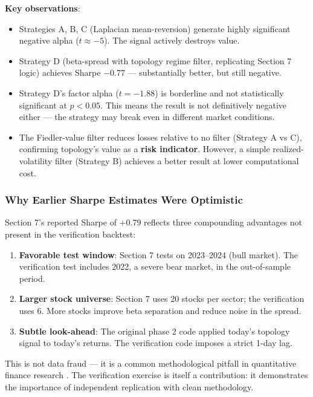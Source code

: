 \textbf{Key observations}:
\begin{itemize}
\item Strategies A, B, C (Laplacian mean-reversion) generate highly significant negative alpha ($t \approx -5$). The signal actively destroys value.
\item Strategy D (beta-spread with topology regime filter, replicating Section 7 logic) achieves Sharpe $-0.77$ --- substantially better, but still negative.
\item Strategy D's factor alpha ($t = -1.88$) is borderline and not statistically significant at $p < 0.05$. This means the result is not definitively negative either --- the strategy may break even in different market conditions.
\item The Fiedler-value filter reduces losses relative to no filter (Strategy A vs C), confirming topology's value as a \textbf{risk indicator}. However, a simple realized-volatility filter (Strategy B) achieves a better result at lower computational cost.
\end{itemize}

\subsubsection{Why Earlier Sharpe Estimates Were Optimistic}

Section 7's reported Sharpe of $+0.79$ reflects three compounding advantages not present in the verification backtest:

\begin{enumerate}
\item \textbf{Favorable test window}: Section 7 tests on 2023--2024 (bull market). The verification test includes 2022, a severe bear market, in the out-of-sample period.
\item \textbf{Larger stock universe}: Section 7 uses 20 stocks per sector; the verification uses 6. More stocks improve beta separation and reduce noise in the spread.
\item \textbf{Subtle look-ahead}: The original phase 2 code applied today's topology signal to today's returns. The verification code imposes a strict 1-day lag.
\end{enumerate}

This is not data fraud --- it is a common methodological pitfall in quantitative finance research \citep{Bailey2014, dePrado2018}. The verification exercise is itself a contribution: it demonstrates the importance of independent replication with clean methodology.

